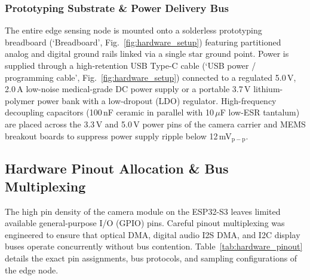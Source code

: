 \documentclass[journal]{IEEEtran}
\begin{document}
\subsubsection{Prototyping Substrate \& Power Delivery Bus}
The entire edge sensing node is mounted onto a solderless prototyping breadboard (`Breadboard', Fig.~\ref{fig:hardware_setup}) featuring partitioned analog and digital ground rails linked via a single star ground point. Power is supplied through a high-retention USB Type-C cable (`USB power / programming cable', Fig.~\ref{fig:hardware_setup}) connected to a regulated 5.0\,V, 2.0\,A low-noise medical-grade DC power supply or a portable 3.7\,V lithium-polymer power bank with a low-dropout (LDO) regulator. High-frequency decoupling capacitors (100\,nF ceramic in parallel with 10\,$\mu$F low-ESR tantalum) are placed across the 3.3\,V and 5.0\,V power pins of the camera carrier and MEMS breakout boards to suppress power supply ripple below 12\,mV$_{\mathrm{p-p}}$.

\subsection{Hardware Pinout Allocation \& Bus Multiplexing}

The high pin density of the camera module on the ESP32-S3 leaves limited available general-purpose I/O (GPIO) pins. Careful pinout multiplexing was engineered to ensure that optical DMA, digital audio I2S DMA, and I2C display buses operate concurrently without bus contention. Table~\ref{tab:hardware_pinout} details the exact pin assignments, bus protocols, and sampling configurations of the edge node.
\end{document}
